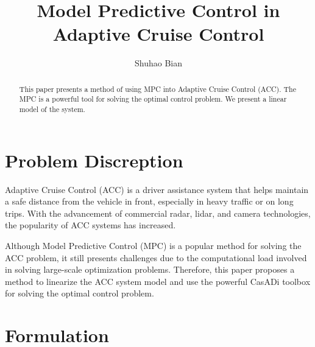 \documentclass{article}
\title{Model Predictive Control in Adaptive Cruise Control}
\author{Shuhao Bian}
\numberwithin{equation}{section}
\begin{document}
\maketitle

\begin{abstract}
    This paper presents a method of using MPC into Adaptive Cruise Control (ACC). 
    The MPC is a powerful tool for solving the optimal control problem. 
    We present a linear model of the system. %
\end{abstract}

\section{Problem Discreption}


Adaptive Cruise Control (ACC) is a driver assistance system that helps maintain a safe 
distance from the vehicle in front, especially in heavy traffic or on long trips. With 
the advancement of commercial radar, lidar, and camera technologies, the popularity of 
ACC systems has increased.

Although Model Predictive Control (MPC) is a popular method for solving the ACC problem, 
it still presents challenges due to the computational load involved in solving large-scale 
optimization problems. Therefore, this paper proposes a method to linearize the ACC system 
model and use the powerful CasADi toolbox\cite{Andersson2018} for solving the optimal control 
problem.

\section{Formulation}
\end{document}

